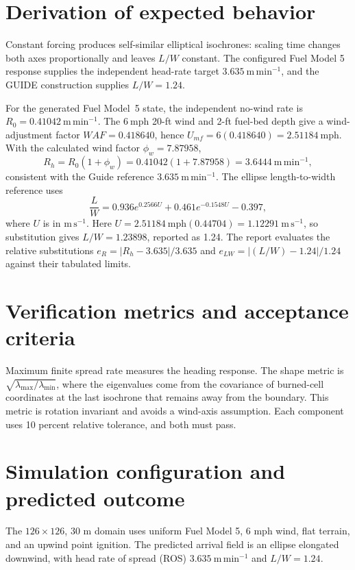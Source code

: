 \section{Derivation of expected behavior}

Constant forcing produces self-similar elliptical isochrones: scaling time changes both axes proportionally and leaves \(L/W\) constant.  The configured Fuel Model 5 response supplies the independent head-rate target \(3.635~\mathrm{m\,min^{-1}}\), and the GUIDE construction supplies \(L/W=1.24\).

For the generated Fuel Model~5 state, the independent no-wind rate is
\(R_0=0.41042~\mathrm{m\,min^{-1}}\).  The \(6~\mathrm{mph}\) 20-ft wind
and 2-ft fuel-bed depth give a wind-adjustment factor
\(WAF=0.418640\), hence
\(U_{mf}=6(0.418640)=2.51184~\mathrm{mph}\).  With the calculated wind
factor \(\phi_w=7.87958\),
\[
 R_h=R_0(1+\phi_w)=0.41042(1+7.87958)
     =3.6444~\mathrm{m\,min^{-1}},
\]
consistent with the Guide reference \(3.635~\mathrm{m\,min^{-1}}\).
The ellipse length-to-width reference uses
\[
 \frac{L}{W}=0.936e^{0.2566U}+0.461e^{-0.1548U}-0.397,
\]
where \(U\) is in \(\mathrm{m\,s^{-1}}\).  Here
\(U=2.51184~\mathrm{mph}(0.44704)=1.12291~\mathrm{m\,s^{-1}}\), so
substitution gives \(L/W=1.23898\), reported as 1.24.  The report evaluates the relative substitutions
\(e_R=|R_h-3.635|/3.635\) and
\(e_{LW}=|(L/W)-1.24|/1.24\) against their tabulated limits.

\section{Verification metrics and acceptance criteria}

Maximum finite spread rate measures the heading response.  The shape metric is \(\sqrt{\lambda_{\max}/\lambda_{\min}}\), where the eigenvalues come from the covariance of burned-cell coordinates at the last isochrone that remains away from the boundary.  This metric is rotation invariant and avoids a wind-axis assumption.  Each component uses 10 percent relative tolerance, and both must pass.

\section{Simulation configuration and predicted outcome}

The \(126\times126\), 30 m domain uses uniform Fuel Model 5, 6 mph wind, flat terrain, and an upwind point ignition.  The predicted arrival field is an ellipse elongated downwind, with head rate of spread (ROS) \(3.635~\mathrm{m\,min^{-1}}\) and \(L/W=1.24\).


